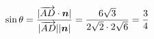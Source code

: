 \documentclass[preview]{standalone}
\begin{document}
\begin{align*}
\special{dvisvgm:raw <g id='unique000'>}\sin\theta=\frac{|\overrightarrow{AD}\cdot\boldsymbol{n}|}{|\overrightarrow{AD}||\boldsymbol{n}|}=\frac{6\sqrt{3}}{2\sqrt{2}\cdot2\sqrt{6}}=\frac{3}{4}\special{dvisvgm:raw </g>}
\end{align*}
\end{document}
